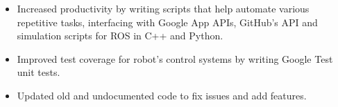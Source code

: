 \documentclass[10pt,a4paper,ragged2e,academicons,withhyper]{altacv}
\begin{document}
\begin{paracol}{2}
  \begin{itemize}
    \item Increased productivity by writing scripts that help automate various repetitive tasks, interfacing with Google App APIs, GitHub’s API and simulation scripts for ROS in C++ and Python.
    \item Improved test coverage for robot’s control systems by writing Google Test unit tests.
    \item Updated old and undocumented code to fix issues and add features.
  \end{itemize}
  \divider\small

\end{paracol}
\end{document}
